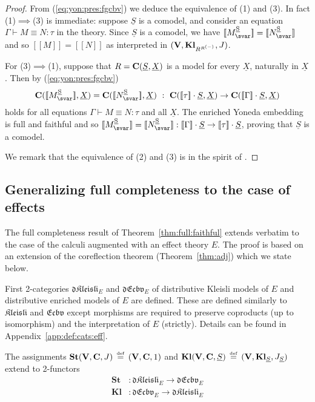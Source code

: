 \documentclass{LMCS}
\newcommand{\comptype}[1]{\underline{#1}}
\newcommand{\co}{\colon}
\newcommand{\algX}{{\comptype{X}}}
\newcommand{\VCat}{\fixedcatfont{V}} \newcommand{\CCat}{\fixedcatfont{C}} \newcommand{\DCat}{\fixedcatfont{D}}
\newcommand{\ltensor}[2]{#1 \cdot #2}
\newcommand{\fixedcatfont}{\mathbf}
\newcommand{\denlb}{[\![}
\newcommand{\denrb}{]\!]}
\newcommand{\den}[1]{\denlb{#1}\denrb}
\newcommand{\stateobj}{{\underline{S}}}
\newcommand{\CATECBV}{\TwoCatFont{Ecbv}}
\newcommand{\dCATECBV}{\TwoCatFont{dEcbv}}
\newcommand{\Freyd}{\TwoCatFont{Kleisli}}
\newcommand{\dFreyd}{\TwoCatFont{dKleisli}}
\newcommand{\CATECBVtheory}[1]{\dCATECBV_{#1}}
\newcommand{\Freydtheory}[1]{\dFreyd_{#1}}
\newcommand{\FreydToECBV}{\mathbf{St}}
\newcommand{\ECBVToFreyd}{\mathbf{Kl}}
\newcommand{\KlCat}[3]{\mathbf{Kl}_{#3}} \newcommand{\Klltensor}[2]{#1 \cdot_{\mathbf{Kl}} #2}
\newcommand{\TwoCatFont}[1]{\mathfrak{#1}}
\newcommand{\eqdef}{\defeq}
\newcommand{\defeq}{\mathrel{\,\stackrel{\mbox{\tiny{$\mathrm{def}$}}}=\,}}
\begin{document}
\begin{proof}
From (\ref{eq:yon:pres:fgcbv}) we deduce the equivalence of (1) and (3). 
In fact (1)$\implies$(3) is immediate:
suppose $\stateobj$ is a comodel, and consider an 
equation ${\Gamma\vdash M\equiv N\colon \tau}$ in the theory.
Since $\stateobj$ is a comodel, we have 
${\den{\CBVtoEECP{M}} = \den{\CBVtoEECP{N}}}$
and so 
$\den M = \den N$ as interpreted in $(\VCat, \KlCat{\VCat}{\CCat}{\retVobj^{\retVobj^{(-)}}}, J)$. 

For (3)$\implies$(1), suppose that 
$\retVobj = \CCat(\stateobj,\algX)$ is a model for every $\algX$, 
naturally in $\algX$. Then by (\ref{eq:yon:pres:fgcbv})  
\[ 
\CCat(\den{\CBVtoEECP{M}},\algX) = \CCat(\den{\CBVtoEECP{N}},\algX)
\ :
\ 
\CCat(\ltensor{\den\tau}\stateobj,\algX)\to \CCat(\ltensor{\den\Gamma}\stateobj,\algX)
\] 
holds for all equations ${\Gamma\vdash M\equiv N\colon \tau}$ and all $\algX$.
The enriched Yoneda embedding
is full and faithful and so
$\den{\CBVtoEECP{M}} = \den{\CBVtoEECP{N}}:\ltensor{\den\Gamma}\stateobj\to\ltensor{\den\tau}\stateobj$, proving that $\stateobj$ is a comodel.

We remark that the equivalence of (2) and (3) is in the spirit of
\cite[\S 6]{Plotkin:Power:03}.
\end{proof}

\subsection{Generalizing full completeness to the case of effects}

\label{sec:fullcomplete-effects}

The full completeness result of Theorem~\ref{thm:full:faithful}
extends verbatim to the case of the calculi augmented with an effect
theory $E$. The proof is based on an extension of the coreflection
theorem (Theorem~\ref{thm:adj}) which we state below.

First 2-categories $\Freydtheory{E}$ and $\CATECBVtheory{E}$ of distributive Kleisli models of $E$ and 
distributive enriched models of $E$ are defined. These are defined similarly to $\Freyd$
and $\CATECBV$ except morphisms are required to preserve coproducts (up to isomorphism) and 
the interpretation of $E$ (strictly). Details can be found in Appendix~\ref{app:def:cats:eff}. 

\begin{lem} \label{lem:functors:eff}
The assignments $\FreydToECBV(\VCat, \CCat, J) \defeq (\VCat, \CCat, 1)$ and 
$\ECBVToFreyd(\VCat, \CCat, \stateobj) \eqdef (\VCat, \KlCat{\VCat}{\CCat}{\stateobj}, J_{\stateobj})$ 
extend to 2-functors 
\begin{align*}
\FreydToECBV & \co \Freydtheory{E} \to \CATECBVtheory{E} \\
\ECBVToFreyd & \co \CATECBVtheory{E} \to \Freydtheory{E} 
\end{align*}
\end{lem}
\end{document}
